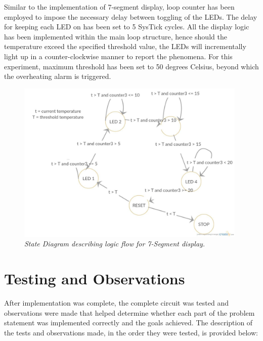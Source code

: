 \documentclass{article}
\begin{document}
\noindent Similar to the implementation of 7-segment display, loop counter has been employed to impose the necessary delay between toggling of the LEDs. The delay for keeping each LED on has been set to 5 SysTick cycles. All the display logic has been implemented within the main loop structure, hence should the temperature exceed the specified threshold value, the LEDs will incrementally light up in a counter-clockwise manner to report the phenomena. For this experiment, maximum threshold has been set to 50 degrees Celsius, beyond which the overheating alarm is triggered.

\begin{figure}[!ht]
\centering 
\includegraphics[width=11cm]{fig_1.jpg}
\caption{\small \sl State Diagram describing logic flow for 7-Segment display.}  
\end{figure}

\section{Testing and Observations}
After implementation was complete, the complete circuit was tested and observations were made that helped determine whether each part of the problem statement was implemented correctly and the goals achieved. The description of the tests and observations made, in the order they were tested, is provided below:
\end{document}
